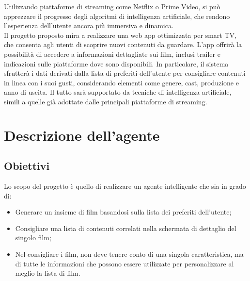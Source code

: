 \documentclass[a4paper,12pt]{article}
\begin{document}
Utilizzando piattaforme di streaming come Netflix o Prime Video, si può apprezzare il progresso degli algoritmi di intelligenza artificiale, che rendono l’esperienza dell’utente ancora più immersiva e dinamica.\\

Il progetto proposto mira a realizzare una web app ottimizzata per smart TV, che consenta agli utenti di scoprire nuovi contenuti da guardare. L’app offrirà la possibilità di accedere a informazioni dettagliate sui film, inclusi trailer e indicazioni sulle piattaforme dove sono disponibili. In particolare, il sistema sfrutterà i dati derivati dalla lista di preferiti dell’utente per consigliare contenuti in linea con i suoi gusti, considerando elementi come genere, cast, produzione e anno di uscita. Il tutto sarà supportato da tecniche di intelligenza artificiale, simili a quelle già adottate dalle principali piattaforme di streaming.

\section{Descrizione dell’agente}

\subsection{Obiettivi}
Lo scopo del progetto è quello di realizzare un agente intelligente che sia in grado di:
	\begin{itemize}
		 \item Generare un insieme di film basandosi sulla lista dei preferiti dell'utente;
		 \item Consigliare una lista di contenuti correlati nella schermata di dettaglio del singolo film;
  		 \item Nel consigliare i film, non deve tenere conto di una singola caratteristica, ma di tutte le informazioni che possono essere utilizzate per personalizzare al meglio la lista di film.
	\end{itemize}

\newpage %
\end{document}
